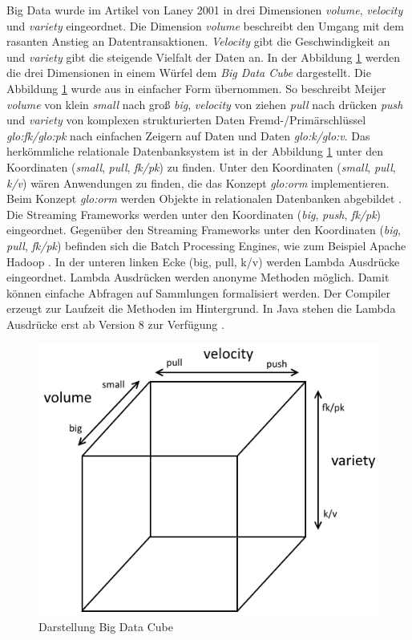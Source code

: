 Big Data wurde im Artikel  von Laney 2001 in drei Dimensionen \textit{volume}, \textit{velocity} und \textit{variety} eingeordnet. Die Dimension \textit{volume} beschreibt den Umgang mit dem rasanten Anstieg an Datentransaktionen. \textit{Velocity} gibt die Geschwindigkeit an und \textit{variety} gibt die steigende Vielfalt der Daten an. In der Abbildung \ref{fig:bigdatacube} werden die drei Dimensionen in einem Würfel dem \textit{Big Data Cube} dargestellt. Die Abbildung \ref{fig:bigdatacube} wurde aus  in einfacher Form übernommen. So beschreibt Meijer \textit{volume} von klein \textit{small} nach groß \textit{big}, \textit{velocity} von ziehen \textit{pull} nach drücken \textit{push} und \textit{variety} von komplexen strukturierten Daten Fremd-/Primärschlüssel \textit{\acrshort{glo:fk}/\acrshort{glo:pk}} nach einfachen Zeigern auf Daten und Daten \textit{\acrshort{glo:k}/\acrshort{glo:v}}. Das herkömmliche relationale Datenbanksystem ist in der Abbildung \ref{fig:bigdatacube} unter den Koordinaten (\textit{small}, \textit{pull}, \textit{fk/pk}) zu finden. Unter den Koordinaten (\textit{small}, \textit{pull}, \textit{k/v}) wären Anwendungen zu finden, die das Konzept \textit{\gls{glo:orm}} implementieren. Beim Konzept \textit{\gls{glo:orm}} werden Objekte in relationalen Datenbanken abgebildet . Die Streaming Frameworks werden unter den Koordinaten (\textit{big}, \textit{push}, \textit{fk/pk}) eingeordnet. Gegenüber den Streaming Frameworks unter den Koordinaten (\textit{big}, \textit{pull}, \textit{fk/pk}) befinden sich die Batch Processing Engines, wie zum Beispiel Apache Hadoop . In der unteren linken Ecke (big, pull, k/v) werden Lambda Ausdrücke eingeordnet. Lambda Ausdrücken werden anonyme Methoden möglich. Damit können einfache Abfragen auf Sammlungen formalisiert werden. Der Compiler erzeugt zur Laufzeit die Methoden im Hintergrund. In Java stehen die Lambda Ausdrücke erst ab Version 8 zur Verfügung .

\begin{figure}[htb!]
\centering
\includegraphics[width=1.0\textwidth]{bilder/bigdatacube.png}
\caption{Darstellung Big Data Cube
\label{fig:bigdatacube}}
\end{figure}


